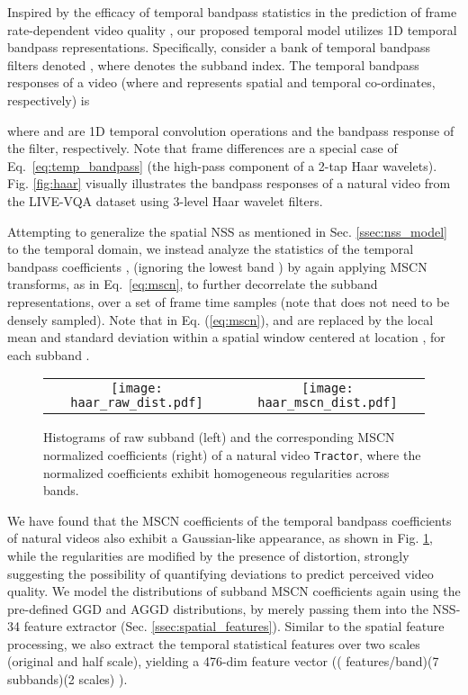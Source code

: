 \documentclass[transmag]{IEEEtran}
\begin{document}
Inspired by the efficacy of temporal bandpass statistics in the prediction of frame rate-dependent video quality \cite{madhusudana2020st}, our proposed temporal model utilizes 1D temporal bandpass representations. Specifically, consider a bank of  temporal bandpass filters denoted , where  denotes the subband index. The temporal bandpass responses of a video  (where  and  represents spatial and temporal co-ordinates, respectively) is

where  and  are 1D temporal convolution operations and the bandpass response of the  filter, respectively. Note that frame differences are a special case of Eq.~\eqref{eq:temp_bandpass} (the high-pass component of a 2-tap Haar wavelets). Fig. \ref{fig:haar} visually illustrates the bandpass responses of a natural video from the LIVE-VQA dataset \cite{seshadrinathan2010study} using 3-level Haar wavelet filters. 

Attempting to generalize the spatial NSS as mentioned in Sec. \ref{ssec:nss_model} to the temporal domain, we instead analyze the statistics of the temporal bandpass coefficients ,  (ignoring the lowest band ) by again applying MSCN transforms, as in Eq.~\eqref{eq:mscn}, to further decorrelate the subband representations, over a set of frame time samples  (note that  does not need to be densely sampled). Note that in Eq. (\ref{eq:mscn}),  and  are replaced by the local mean and standard deviation within a spatial window centered at location , for each subband .

\begin{figure}[!t]
\centering
\footnotesize
\def\xheight{0.485}
\setlength{\tabcolsep}{1pt}
\begin{tabular}{cc}
\texttt{[image: haar\_raw\_dist.pdf]} &
\texttt{[image: haar\_mscn\_dist.pdf]} \\
\end{tabular}
\caption{Histograms of raw subband (left) and the corresponding MSCN normalized coefficients (right) of a natural video \texttt{Tractor}, where the normalized coefficients exhibit homogeneous regularities across bands.}
\label{fig:temp_stats}
\end{figure}

We have found that the MSCN coefficients of the temporal bandpass coefficients of natural videos also exhibit a Gaussian-like appearance, as shown in Fig. \ref{fig:temp_stats}, while the regularities are modified by the presence of distortion, strongly suggesting the possibility of quantifying deviations to predict perceived video quality. We model the distributions of subband MSCN coefficients again using the pre-defined GGD and AGGD distributions, by merely passing them into the NSS-34 feature extractor (Sec. \ref{ssec:spatial_features}). Similar to the spatial feature processing, we also extract the temporal statistical features over two scales (original and half scale), yielding a 476-dim feature vector (( features/band)(7 subbands)(2 scales) ).
\end{document}
